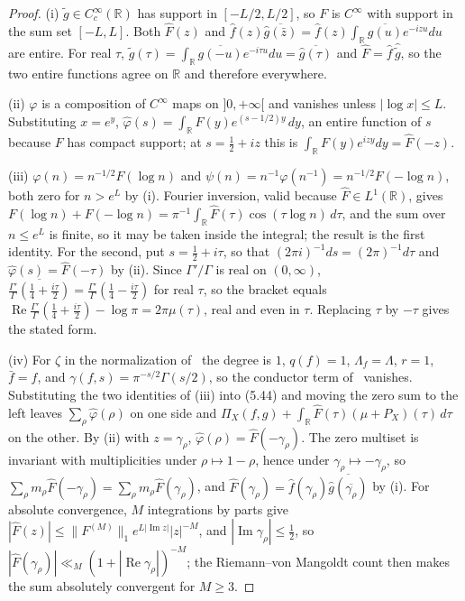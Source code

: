 \documentclass[11pt]{article}
\theoremstyle{definition}
\newcommand{\R}{\mathbb{R}}
\begin{document}
\begin{proof}
(i) $\tilde g\in C^\infty_c(\R)$ has support in $[-L/2,L/2]$, so $F$ is
$C^\infty$ with support in the sum set $[-L,L]$. Both $\widehat F(z)$ and
$\widehat f(z)\overline{\widehat g(\bar z)}=\widehat f(z)\int_\R\overline{g(u)}e^{-izu}du$
are entire. For real $\tau$,
$\widehat{\tilde g}(\tau)=\int_\R\overline{g(-u)}e^{-i\tau u}du=\overline{\widehat g(\tau)}$
and $\widehat F=\widehat f\,\widehat{\tilde g}$, so the two entire functions agree
on $\R$ and therefore everywhere.

(ii) $\varphi$ is a composition of $C^\infty$ maps on $]0,+\infty[$ and vanishes
unless $|\log x|\le L$. Substituting $x=e^{y}$,
$\widehat\varphi(s)=\int_\R F(y)e^{(s-1/2)y}\,dy$, an entire function of $s$
because $F$ has compact support; at $s=\tfrac12+iz$ this is
$\int_\R F(y)e^{izy}dy=\widehat F(-z)$.

(iii) $\varphi(n)=n^{-1/2}F(\log n)$ and
$\psi(n)=n^{-1}\varphi(n^{-1})=n^{-1/2}F(-\log n)$, both zero for $n>e^{L}$ by
(i). Fourier inversion, valid because $\widehat F\in L^1(\R)$, gives
$F(\log n)+F(-\log n)=\pi^{-1}\int_\R\widehat F(\tau)\cos(\tau\log n)\,d\tau$, and
the sum over $n\le e^{L}$ is finite, so it may be taken inside the integral; the
result is the first identity. For the second, put $s=\tfrac12+i\tau$, so that
$(2\pi i)^{-1}ds=(2\pi)^{-1}d\tau$ and $\widehat\varphi(s)=\widehat F(-\tau)$ by
(ii). Since $\Gamma'/\Gamma$ is real on $(0,\infty)$,
$\overline{\tfrac{\Gamma'}{\Gamma}(\tfrac14+\tfrac{i\tau}{2})}=\tfrac{\Gamma'}{\Gamma}(\tfrac14-\tfrac{i\tau}{2})$
for real $\tau$, so the bracket equals
$\operatorname{Re}\tfrac{\Gamma'}{\Gamma}(\tfrac14+\tfrac{i\tau}{2})-\log\pi=2\pi\mu(\tau)$,
real and even in $\tau$. Replacing $\tau$ by $-\tau$ gives the stated form.

(iv) For $\zeta$ in the normalization of~\cite{IK04} the degree is $1$,
$q(f)=1$, $\Lambda_f=\Lambda$, $r=1$, $\bar f=f$, and
$\gamma(f,s)=\pi^{-s/2}\Gamma(s/2)$, so the conductor term of~\cite[(5.44)]{IK04} vanishes.
Substituting the two identities of (iii) into (5.44) and moving the zero sum to
the left leaves $\sum_\rho\widehat\varphi(\rho)$ on one side and
$\Pi_X(f,g)+\int_\R\widehat F(\tau)(\mu+P_X)(\tau)\,d\tau$ on the other. By (ii)
with $z=\gamma_\rho$, $\widehat\varphi(\rho)=\widehat F(-\gamma_\rho)$. The zero
multiset is invariant with multiplicities under $\rho\mapsto1-\rho$, hence under
$\gamma_\rho\mapsto-\gamma_\rho$, so
$\sum_\rho m_\rho\widehat F(-\gamma_\rho)=\sum_\rho m_\rho\widehat F(\gamma_\rho)$,
and $\widehat F(\gamma_\rho)=\widehat f(\gamma_\rho)\overline{\widehat g(\overline{\gamma_\rho})}$
by (i). For absolute convergence, $M$ integrations by parts give
$|\widehat F(z)|\le\|F^{(M)}\|_1e^{L|\operatorname{Im}z|}|z|^{-M}$, and
$|\operatorname{Im}\gamma_\rho|\le\tfrac12$, so
$|\widehat F(\gamma_\rho)|\ll_M(1+|\operatorname{Re}\gamma_\rho|)^{-M}$; the
Riemann--von Mangoldt count then makes the sum absolutely convergent for
$M\ge3$.


\end{proof}
\end{document}
